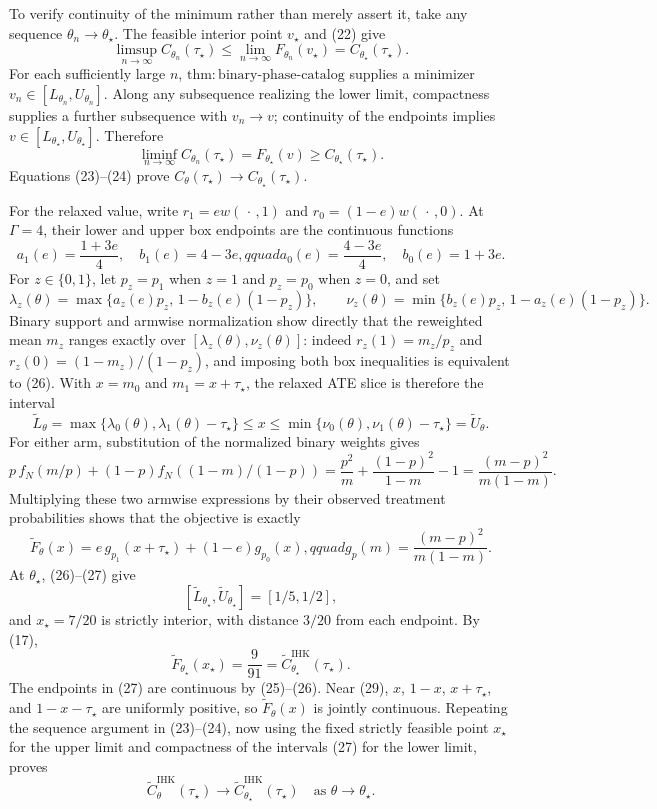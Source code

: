 To verify continuity of the minimum rather than merely assert it, take any sequence \(\theta_n\to\theta_\star\).  The feasible interior point \(v_\star\) and (22) give
\[
 \limsup_{n\to\infty}C_{\theta_n}(\tau_\star)
 \leq\lim_{n\to\infty}F_{\theta_n}(v_\star)
 =C_{\theta_\star}(\tau_\star). \tag{23}
\]
For each sufficiently large \(n\), \(\mathrm{thm{:}binary\mbox{-}phase\mbox{-}catalog}\) supplies a minimizer \(v_n\in[L_{\theta_n},U_{\theta_n}]\).  Along any subsequence realizing the lower limit, compactness supplies a further subsequence with \(v_n\to v\); continuity of the endpoints implies \(v\in[L_{\theta_\star},U_{\theta_\star}]\).  Therefore
\[
 \liminf_{n\to\infty}C_{\theta_n}(\tau_\star)
 =F_{\theta_\star}(v)\geq C_{\theta_\star}(\tau_\star). \tag{24}
\]
Equations (23)--(24) prove \(C_\theta(\tau_\star)\to C_{\theta_\star}(\tau_\star)\).

For the relaxed value, write \(r_1=e w(\,\cdot\,,1)\) and \(r_0=(1-e)w(\,\cdot\,,0)\).  At \(\Gamma=4\), their lower and upper box endpoints are the continuous functions
\[
 a_1(e)=\frac{1+3e}{4},\quad b_1(e)=4-3e,qquad
 a_0(e)=\frac{4-3e}{4},\quad b_0(e)=1+3e. \tag{25}
\]
For \(z\in\{0,1\}\), let \(p_z=p_1\) when \(z=1\) and \(p_z=p_0\) when \(z=0\), and set
\[
 \lambda_z(\theta)=\max\{a_z(e)p_z,\,1-b_z(e)(1-p_z)\},\qquad
 \nu_z(\theta)=\min\{b_z(e)p_z,\,1-a_z(e)(1-p_z)\}. \tag{26}
\]
Binary support and armwise normalization show directly that the reweighted mean \(m_z\) ranges exactly over \([\lambda_z(\theta),\nu_z(\theta)]\): indeed \(r_z(1)=m_z/p_z\) and \(r_z(0)=(1-m_z)/(1-p_z)\), and imposing both box inequalities is equivalent to (26).  With \(x=m_0\) and \(m_1=x+\tau_\star\), the relaxed ATE slice is therefore the interval
\[
 \widetilde L_\theta=\max\{\lambda_0(\theta),\lambda_1(\theta)-\tau_\star\}
 \leq x\leq
 \min\{\nu_0(\theta),\nu_1(\theta)-\tau_\star\}=\widetilde U_\theta. \tag{27}
\]
For either arm, substitution of the normalized binary weights gives
\[
 p\,f_N(m/p)+(1-p)f_N((1-m)/(1-p))
 =\frac{p^2}{m}+\frac{(1-p)^2}{1-m}-1
 =\frac{(m-p)^2}{m(1-m)}.
\]
Multiplying these two armwise expressions by their observed treatment probabilities shows that the objective is exactly
\[
 \widetilde F_\theta(x)
 =e\,g_{p_1}(x+\tau_\star)+(1-e)g_{p_0}(x),qquad
 g_p(m)=\frac{(m-p)^2}{m(1-m)}. \tag{28}
\]
At \(\theta_\star\), (26)--(27) give
\[
 [\widetilde L_{\theta_\star},\widetilde U_{\theta_\star}]=[1/5,1/2], \tag{29}
\]
and \(x_\star=7/20\) is strictly interior, with distance \(3/20\) from each endpoint.  By (17),
\[
 \widetilde F_{\theta_\star}(x_\star)=\frac{9}{91}
 =\widetilde C^{\mathrm{IHK}}_{\theta_\star}(\tau_\star). \tag{30}
\]
The endpoints in (27) are continuous by (25)--(26).  Near (29), \(x\), \(1-x\), \(x+\tau_\star\), and \(1-x-\tau_\star\) are uniformly positive, so \(\widetilde F_\theta(x)\) is jointly continuous.  Repeating the sequence argument in (23)--(24), now using the fixed strictly feasible point \(x_\star\) for the upper limit and compactness of the intervals (27) for the lower limit, proves
\[
 \widetilde C^{\mathrm{IHK}}_\theta(\tau_\star)
 \longrightarrow
 \widetilde C^{\mathrm{IHK}}_{\theta_\star}(\tau_\star)
 \quad\text{as }\theta\to\theta_\star. \tag{31}
\]

